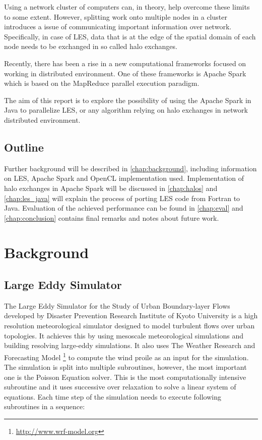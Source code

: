 \documentclass{l4proj}
\begin{document}
Using a network cluster of computers can, in theory, help overcome these limits to some extent.
However, splitting work onto multiple nodes in a cluster introduces a issue of communicating
important information over network. Specifically, in case of LES, data that is at the edge of
the spatial domain of each node needs to be exchanged in so called halo exchanges.

Recently, there has been a rise in a new computational frameworks focused on working in
distributed environment. One of these frameworks is Apache Spark which is based on
the MapReduce parallel execution paradigm.

The aim of this report is to explore the possibility of using the Apache Spark in Java to parallelize
LES, or any algorithm relying on halo exchanges in network distributed environment.

\section{Outline}

Further background will be described in \autoref{chap:background}, including information
on LES, Apache Spark and OpenCL implementation used. Implementation of halo exchanges in 
Apache Spark will be discussed in \autoref{chap:halos} and \autoref{chap:les_java} will
explain the process of porting LES code from Fortran to Java. Evaluation of the achieved
performance can be found in \autoref{chap:eval} and \autoref{chap:conclusion} contains
final remarks and notes about future work.

\chapter{Background}
\label{chap:background}

\section{Large Eddy Simulator}

The Large Eddy Simulator for the Study of Urban Boundary-layer Flows developed by
Disaster Prevention Research Institute of Kyoto University is a high resolution
meteorological simulator designed to model turbulent flows over urban topologies. 
It achieves this by using mesoscale meteorological simulations and building resolving
large-eddy simulations. It also uses The Weather Research and Forecasting Model \footnote{\url{http://www.wrf-model.org}}
to compute the wind proile as an input for the simulation. The simulation is split into
multiple subroutines, however, the most important one is the Poisson Equation solver.
This is the most computationally intensive subroutine and it uses successive over relaxation to solve
a linear system of equations. Each time step of the simulation needs to execute following subroutines
in a sequence:
\end{document}
